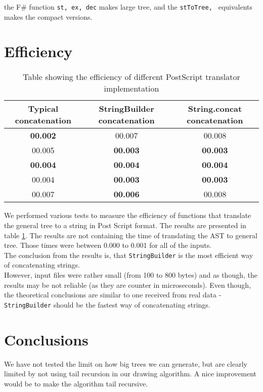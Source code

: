 \documentclass[10pt]{scrartcl}
\begin{document}
the F\# function \texttt{st, ex, dec} makes large tree, and the \texttt{stToTree, } equivalents makes the compact versions.
\section{Efficiency}
\begin{table} [!h]
\centering
\begin{tabular}{c|c|c}
  \textbf{Typical concatenation}  & \textbf{StringBuilder concatenation} & \textbf{String.concat concatenation} \\
  \hline
  \textbf{00.002} & 00.007 & 00.008 \\
  \hline
  00.005 & \textbf{00.003} & \textbf{00.003} \\
  \hline
  \textbf{00.004} & \textbf{00.004} & \textbf{00.004} \\
  \hline
  00.004 & \textbf{00.003} & \textbf{00.003} \\
  \hline
  00.007 & \textbf{00.006} & 00.008 \\
\end{tabular} 
\caption{Table showing the efficiency of different PostScript translator implementation}
\label{tab:eff}
\end{table}
We performed various  tests to measure the efficiency of functions that translate the general tree to a string in Post Script format. The results are presented in table \ref{tab:eff}. The results are not containing the time of translating the AST to general tree. Those times were between 0.000 to 0.001 for all of the inputs. \\
The conclusion from the results is, that \texttt{StringBuilder} is the most efficient way of concatenating strings. \\
However, input files were rather small (from 100 to 800 bytes) and as though, the results may be not reliable (as they are counter in microseconds). Even though, the theoretical conclusions are similar to one received from real data - \texttt{StringBuilder} should be the fastest way of concatenating strings. 
\section{Conclusions}
We have not tested the limit on how big trees we can generate, but are clearly limited by not using tail recursion in our drawing algorithm. A nice improvement would be to make the algorithm tail recursive.



\end{document}
